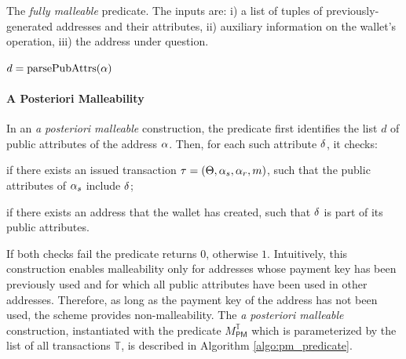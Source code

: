 \begin{algorithm}
    \caption{The \emph{fully malleable} predicate. The inputs are: i) a list of tuples of previously-generated addresses and their attributes, ii) auxiliary information on the wallet's operation, iii) the address under question.}\label{algo:fm_predicate}
    \begin{algorithmic}
                    \State {}
                \EndCase
                    \State $d = \textrm{parsePubAttrs}(\alpha)$
                            \State {} 
                        \EndIf
                    \EndFor
                \EndCase
            \EndSwitch
            \State {}
        \EndFunction
    \end{algorithmic}
\end{algorithm}

\paragraph{A Posteriori Malleability}
In an \emph{a posteriori malleable} construction, the predicate first
identifies the list $d$ of public attributes of the address $\alpha$.  Then, for
each such attribute $\delta$, it checks:
\begin{inparaenum}[i)]
    \item if there exists an issued transaction $\tau = (\Theta, \alpha_s,
        \alpha_r, m)$, such that the public attributes of $\alpha_s$ include
        $\delta$;
    \item if there exists an address that the wallet has created, such that
        $\delta$ is part of its public attributes.
\end{inparaenum}
If both checks fail the predicate returns $0$, otherwise $1$.  Intuitively,
this construction enables malleability only for addresses whose payment key has
been previously used and for which all public attributes have been used in
other addresses. Therefore, as long as the payment key of the address has not
been used, the scheme provides non-malleability. The \emph{a posteriori
malleable} construction, instantiated with the predicate
$M^{\mathbb{T}}_{\mathsf{PM}}$ which is parameterized by the list of all
transactions $\mathbb{T}$, is described in Algorithm \ref{algo:pm_predicate}.

